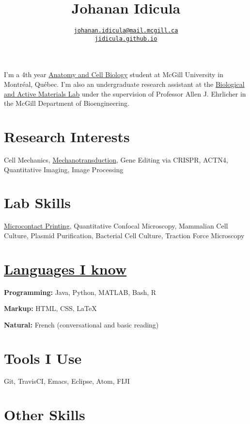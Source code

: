 \documentclass[%
	12pt,%
	]
	{article}
\title{\textbf{Johanan Idicula}}
\author{\href{mailto:johanan.idicula@mail.mcgill.ca}{\tt{johanan.idicula@mail.mcgill.ca}} \\ \href{https://jidicula.github.io/}{\tt{jidicula.github.io}}}
\date{} %
\begin{document}
\pagestyle{fancy}
\setlength\headheight{14pt}

\maketitle
\thispagestyle{fancy}



I'm a 4th year \href{http://www.mcgill.ca/anatomy}{Anatomy and Cell Biology} student at McGill University in Montr\'eal, Qu\'ebec. I'm also an undergraduate research assistant at the \href{http://bam.lab.mcgill.ca/}{Biological and Active Materials Lab} under the supervision of Professor Allen J. Ehrlicher in the McGill Department of Bioengineering.

\section*{Research Interests}

Cell Mechanics, \href{http://bam.lab.mcgill.ca/project_pages/ACTN4_Mechanosensitivity.html}{Mechanotransduction}, Gene Editing via CRISPR, ACTN4, Quantitative Imaging, Image Processing

\section*{Lab Skills}

\href{https://jidicula.github.io/images/micropattern.jpg}{Microcontact Printing}, Quantitative Confocal Microscopy, Mammalian Cell Culture, Plasmid Purification, Bacterial Cell Culture, Traction Force Microscopy


\section*{\href{https://github.com/jidicula}{Languages I know}}

\textbf{Programming:} Java, Python, MATLAB, Bash, R

\textbf{Markup:} HTML, CSS, \LaTeX

\textbf{Natural:} French (conversational and basic reading)

\section*{Tools I Use}

Git, TravisCI, Emacs, Eclipse, Atom, FIJI

\section*{Other Skills}
\end{document}
